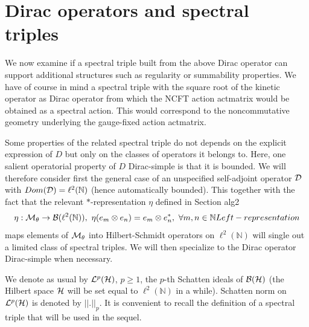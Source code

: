 \documentclass[10pt]{book}
\theoremstyle{break}
\begin{document}

\section{Dirac operators and spectral triples}
We now examine if a spectral triple built from the above Dirac operator can support additional structures such as regularity or summability properties. We have of course in mind a spectral triple with the square root of the kinetic operator as Dirac operator from which the NCFT action {actmatrix} would be obtained as a spectral action. This would correspond to the noncommutative geometry underlying the gauge-fixed action {actmatrix}.\par 

Some properties of the related spectral triple do not depends on the explicit expression of $D$ but only on the classes of operators it belongs to. Here, one salient operatorial property of $D$ {Dirac-simple} is that it is bounded. We will therefore consider first the general case of an unspecified self-adjoint operator ${\cal{D}}$ with $Dom({\cal{D}})=\ell^2(\mathbb{N})$ (hence automatically bounded). This together with the fact that the relevant $*$-representation $\eta$ defined in Section {alg2} 
\begin{equation}
\eta:{\cal{M}}_\theta\to{\cal{B}}(\ell^2(\mathbb{N})),\ \eta(e_m\otimes e_n)=e_m\otimes e^*_n,\ \forall m,n\in\mathbb{N}{Left-representation}
\end{equation}
maps elements of ${\cal{M}}_\theta$ into Hilbert-Schmidt operators on $\ell^2(\mathbb{N})$ will single out a limited class of spectral triples. We will then specialize to the Dirac operator {Dirac-simple} when necessary.\par

We denote as usual by ${\cal{L}}^p({\cal{H}})$, $p\ge1$, the $p$-th Schatten ideals of ${\cal{B}}({\cal{H}})$ (the Hilbert space ${\cal{H}}$ will be set equal to $\ell^2(\mathbb{N})$ in a while). Schatten norm on ${\cal{L}}^p({\cal{H}})$ 
is denoted by $||.||_p$. It is convenient to recall the definition of a spectral triple that will be used in the sequel.
\end{document}

